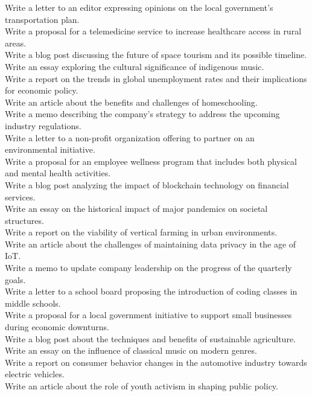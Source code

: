 \begin{examplebox}
Write a letter to an editor expressing opinions on the local government's transportation plan. \\
Write a proposal for a telemedicine service to increase healthcare access in rural areas. \\
Write a blog post discussing the future of space tourism and its possible timeline. \\
Write an essay exploring the cultural significance of indigenous music. \\
Write a report on the trends in global unemployment rates and their implications for economic policy. \\
Write an article about the benefits and challenges of homeschooling. \\
Write a memo describing the company's strategy to address the upcoming industry regulations. \\
Write a letter to a non-profit organization offering to partner on an environmental initiative. \\
Write a proposal for an employee wellness program that includes both physical and mental health activities. \\
Write a blog post analyzing the impact of blockchain technology on financial services. \\
Write an essay on the historical impact of major pandemics on societal structures. \\
Write a report on the viability of vertical farming in urban environments. \\
Write an article about the challenges of maintaining data privacy in the age of IoT. \\
Write a memo to update company leadership on the progress of the quarterly goals. \\
Write a letter to a school board proposing the introduction of coding classes in middle schools. \\
Write a proposal for a local government initiative to support small businesses during economic downturns. \\
Write a blog post about the techniques and benefits of sustainable agriculture. \\
Write an essay on the influence of classical music on modern genres. \\
Write a report on consumer behavior changes in the automotive industry towards electric vehicles. \\
Write an article about the role of youth activism in shaping public policy.
\end{examplebox}

